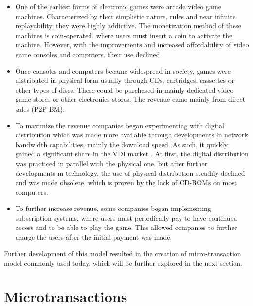 \documentclass[10pt,british,a4paper,titlepage]{article}
\begin{document}
\begin{itemize}

\item One of the earliest forms of electronic games were arcade video game machines. Characterized by their simplistic nature, rules and near infinite replayability, they were highly addictive\cite{gao2022nature:arcade}. The monetization method of these machines is coin-operated, where users must insert a coin to activate the machine. However, with the improvements and increased affordability of video game consoles and computers, their use declined \cite{osathanunkul2015classification:business}.

\item Once consoles and computers became widespread in society, games were distributed in physical form usually through CDs, cartridges, cassettes or other types of discs. These could be purchased in mainly dedicated video game stores  or other electronics stores. The revenue came mainly from direct sales (P2P BM).

\item To maximize the revenue companies began experimenting with digital distribution which was made more available through developments in network bandwidth capabilities, mainly the download speed. As such, it quickly gained a significant share in the VDI market \cite{osathanunkul2015classification:business}. At first, the digital distribution was practiced in parallel with the physical one, but after further developments in technology, the use of physical distribution steadily declined and was made obsolete, which is proven by the lack of CD-ROMs on most computers.

\item To further increase revenue, some companies began implementing subscription systems, where users must periodically pay to have continued access and to be able to play the game. This allowed companies to further charge the users after the initial payment was made. 

\end{itemize}
Further development of this model resulted in the creation of micro-transaction model commonly used today, which will be further explored in the next section.



\section{Microtransactions}
\end{document}

